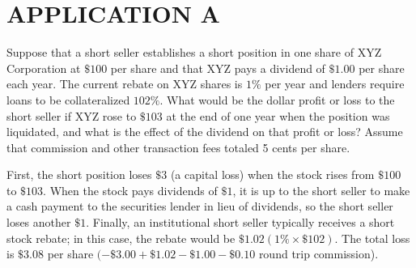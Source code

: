 \documentclass[11pt]{article}
\begin{document}
\section*{APPLICATION A}
Suppose that a short seller establishes a short position in one share of XYZ Corporation at $\$ 100$ per share and that XYZ pays a dividend of $\$ 1.00$ per share each year. The current rebate on XYZ shares is $1 \%$ per year and lenders require loans to be collateralized $102 \%$. What would be the dollar profit or loss to the short seller if $\mathrm{XYZ}$ rose to $\$ 103$ at the end of one year when the position was liquidated, and what is the effect of the dividend on that profit or loss? Assume that commission and other transaction fees totaled 5 cents per share.

First, the short position loses $\$ 3$ (a capital loss) when the stock rises from $\$ 100$ to $\$ 103$. When the stock pays dividends of $\$ 1$, it is up to the short seller to make a cash payment to the securities lender in lieu of dividends, so the short seller loses another $\$ 1$. Finally, an institutional short seller typically receives a short stock rebate; in this case, the rebate would be $\$ 1.02(1 \% \times \$ 102)$. The total loss is $\$ 3.08$ per share $(-\$ 3.00+\$ 1.02-\$ 1.00-\$ 0.10$ round trip commission).
\end{document}
